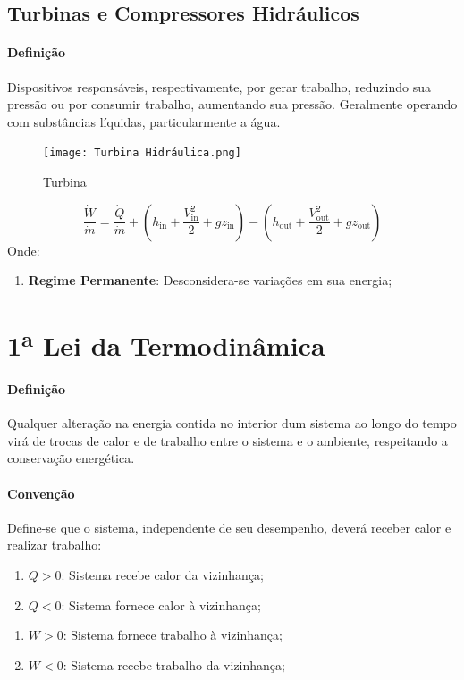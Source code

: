\documentclass{article}
\begin{document}
        \subsection{Turbinas e Compressores Hidráulicos}
            \paragraph{Definição}Dispositivos responsáveis, respectivamente, por gerar trabalho, reduzindo sua pressão ou por consumir trabalho, aumentando sua pressão. Geralmente operando com substâncias líquidas, particularmente a água.
                \begin{figure}[h]
                    \centering
                    \texttt{[image: Turbina Hidráulica.png]}
                    \caption{Turbina}
                \end{figure}
                \[\boxed{
                    \frac{\dot{W}}{\dot{m}} =
                    \frac{\dot{Q}}{\dot{m}} +
                    \left(h_{\text{in}} + \frac{V^{2}_{\text{in}}}{2} + gz_{\text{in}}\right) -
                    \left(h_{\text{out}} + \frac{V^{2}_{\text{out}}}{2} + gz_{\text{out}}\right)}\]
            Onde:
                \begin{enumerate}[noitemsep]
                    \item \textbf{Regime Permanente}: Desconsidera-se variações em sua energia;
                \end{enumerate}
\newpage


    \section{1\textsuperscript{a} Lei da Termodinâmica}
        \paragraph{Definição}Qualquer alteração na energia contida no interior dum sistema ao longo do tempo virá de trocas de calor e de trabalho entre o sistema e o ambiente, respeitando a conservação energética.


        \paragraph{Convenção}Define-se que o sistema, independente de seu desempenho, deverá receber calor e realizar trabalho:
            \begin{enumerate}[noitemsep]
                \item $Q>0$: Sistema recebe calor da vizinhança;
                \item $Q<0$: Sistema fornece calor à vizinhança;
            \end{enumerate}
            \begin{enumerate}[noitemsep]
                \item $W>0$: Sistema fornece trabalho à vizinhança;
                \item $W<0$: Sistema recebe trabalho da vizinhança;
            \end{enumerate}
\end{document}
